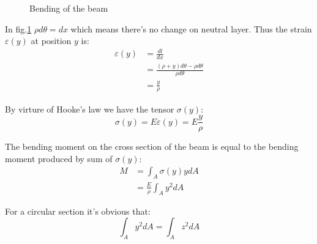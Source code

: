 \begin{figure}[H]
    \centering
    \caption{Bending of the beam}
    \label{Bending of the beam}
\end{figure}

In fig.\ref{Bending of the beam} $\rho d\theta=dx$ which means there's no change on neutral layer. 
Thus the strain $\varepsilon(y)$ at position $y$ is:
\begin{equation}
    \begin{aligned}
        \varepsilon(y)&=
        \frac{dl}{dx}\\
        &=
        \frac{(\rho+y)d\theta - \rho d\theta}{\rho d\theta}\\
        &=\frac{y}{\rho}
    \end{aligned}
\end{equation}

By virture of Hooke's law we have the tensor $\sigma(y)$:
\begin{equation}
    \sigma(y) = E\varepsilon(y)=E\frac{y}{\rho}
\end{equation}

The bending moment on the cross section of the beam is equal to the bending moment produced by sum of $\sigma(y)$:
\begin{equation}
    \begin{aligned}
        M&=
        \int_A
        \sigma(y)y
        dA\\
        &=
        \frac{E}{\rho}
        \int_A y^2 dA
    \end{aligned}
\end{equation}

For a circular section it's obvious that:
\begin{equation}
    \int_A y^2 dA = 
    \int_A z^2 dA
\end{equation}

